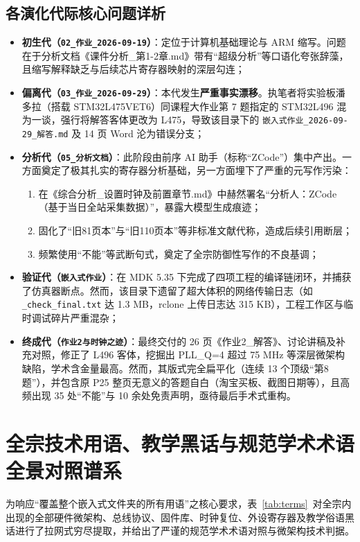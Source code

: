 \documentclass[11pt,a4paper]{ctexart}
\begin{document}
\subsection*{各演化代际核心问题详析}
\begin{itemize}
  \item \textbf{初生代（\texttt{02\_作业\_2026-09-19}）}：定位于计算机基础理论与 ARM 缩写。问题在于分析文档《课件分析\_第1-2章.md》带有“超级分析”等口语化夸张辞藻，且缩写解释缺乏与后续芯片寄存器映射的深层勾连；
  \item \textbf{偏离代（\texttt{03\_作业\_2026-09-29}）}：本代发生\textbf{严重事实漂移}。执笔者将实验板潘多拉（搭载 STM32L475VET6）同课程大作业第 7 题指定的 STM32L496 混为一谈，强行将解答客体更改为 L475，导致该目录下的 \texttt{嵌入式作业\_2026-09-29\_解答.md} 及 14 页 Word 沦为错误分支；
  \item \textbf{分析代（\texttt{05\_分析文档}）}：此阶段由前序 AI 助手（标称“ZCode”）集中产出。一方面奠定了极其扎实的寄存器分析基础，另一方面埋下了严重的元写作污染：
  \begin{enumerate}[label=\textbf{\arabic*.}]
    \item 在《综合分析\_设置时钟及前置章节.md》中赫然署名“分析人：ZCode（基于当日全站采集数据）”，暴露大模型生成痕迹；
    \item 固化了“旧81页本”与“旧110页本”等非标准文献代称，造成后续引用断层；
    \item 频繁使用“不能”等武断句式，奠定了全宗防御性写作的不良基调；
  \end{enumerate}
  \item \textbf{验证代（\texttt{嵌入式作业}）}：在 MDK 5.35 下完成了四项工程的编译链闭环，并捕获了仿真器断点。然而，该目录下遗留了超大体积的网络传输日志（如 \texttt{\_check\_final.txt} 达 1.3 MB，rclone 上传日志达 315 KB），工程工作区与临时调试碎片严重混杂；
  \item \textbf{终成代（\texttt{作业2与时钟之迹}）}：最终交付的 26 页《作业2\_解答》、讨论讲稿及补充对照，修正了 L496 客体，挖掘出 PLL\_Q=4 超过 75 MHz 等深层微架构缺陷，学术含金量最高。然而，其版式完全扁平化（连续 13 个顶级“第8题”），并包含原 P25 整页无意义的答题自白（淘宝买板、截图日期等），且高频出现 35 处“不能”与 10 余处免责声明，亟待最后手术式重构。
\end{itemize}

\section{全宗技术用语、教学黑话与规范学术术语全景对照谱系}
为响应“覆盖整个嵌入式文件夹的所有用语”之核心要求，表~\ref{tab:terms}~对全宗内出现的全部硬件微架构、总线协议、固件库、时钟复位、外设寄存器及教学俗语黑话进行了拉网式穷尽提取，并给出了严谨的规范学术术语对照与微架构技术判据。
\end{document}
